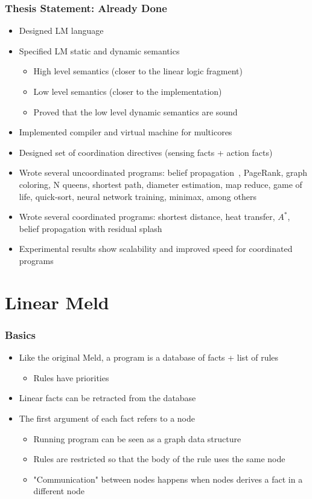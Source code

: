 \documentclass{beamer}
\begin{document}
\begin{frame}[fragile]
   \frametitle{Thesis Statement: Already Done}
   \begin{itemize}
      \item Designed LM language
      \item Specified LM static and dynamic semantics
      \begin{itemize}
         \item High level semantics (closer to the linear logic fragment)
         \item Low level semantics (closer to the implementation)
         \item Proved that the low level dynamic semantics are sound
      \end{itemize}
      \item Implemented compiler and virtual machine for multicores
      \item Designed set of coordination directives (sensing facts + action facts)
      \item Wrote several uncoordinated programs: belief propagation~\cite{Gonzalez+al:aistats09paraml},
      PageRank, graph coloring,
      N queens, shortest path, diameter estimation, map reduce, game of life, quick-sort, neural network training, minimax, among others
      \item Wrote several coordinated programs: shortest distance, heat transfer, $A^{*}$, belief propagation with residual splash~\cite{Gonzalez+al:aistats09paraml}
      \item Experimental results show scalability and improved speed for coordinated programs
   \end{itemize}
\end{frame}

\section{Linear Meld}

\begin{frame}[fragile]
   \frametitle{Basics}
   \begin{itemize}
      \item Like the original Meld, a program is a database of facts + list of rules
      \begin{itemize}
         \item Rules have priorities
      \end{itemize}
      \item Linear facts can be retracted from the database
      \item The first argument of each fact refers to a node
      \begin{itemize}
         \item Running program can be seen as a graph data structure
         \item Rules are restricted so that the body of the rule uses the same node
         \item "Communication" between nodes happens when nodes derives a fact in a different node
      \end{itemize}
   \end{itemize}
\end{frame}
\end{document}
